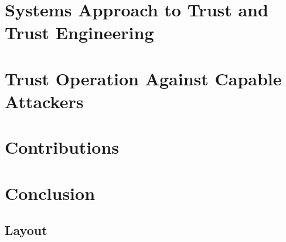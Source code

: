 \section{Systems Approach to Trust and Trust Engineering}


\section{Trust Operation Against Capable Attackers}


\section{Contributions}


\section{Conclusion}
\subsection{Layout}

